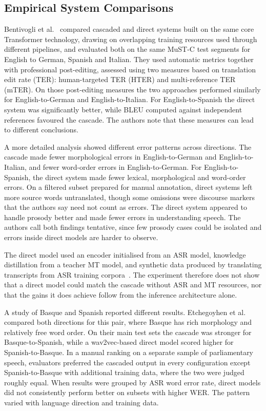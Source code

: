 \subsection{Empirical System Comparisons}

Bentivogli et al.~\cite{bentivogli2021cascade} compared cascaded and direct
systems built on the same core Transformer technology, drawing on overlapping
training resources used through different pipelines, and evaluated both on the
same MuST-C test segments for English to German, Spanish and Italian. They used
automatic metrics together with professional post-editing, assessed using two
measures based on translation edit rate (TER): human-targeted TER (HTER) and
multi-reference TER (mTER). On those post-editing measures the two approaches
performed similarly for English-to-German and English-to-Italian. For
English-to-Spanish the direct system was significantly better, while BLEU
computed against independent references favoured the cascade. The authors note
that these measures can lead to different conclusions.

A more detailed analysis showed different error patterns across directions. The
cascade made fewer morphological errors in English-to-German and
English-to-Italian, and fewer word-order errors in English-to-German. For
English-to-Spanish, the direct system made fewer lexical, morphological and
word-order errors. On a filtered subset prepared for manual annotation, direct
systems left more source words untranslated, though some omissions were
discourse markers that the authors say need not count as errors. The direct
system appeared to handle prosody better and made fewer errors in understanding
speech. The authors call both findings tentative, since few prosody cases could
be isolated and errors inside direct models are harder to observe.

The direct model used an encoder initialised from an ASR model, knowledge
distillation from a teacher MT model, and synthetic data produced by translating
transcripts from ASR training corpora~\cite{bentivogli2021cascade}. The
experiment therefore does not show that a direct model could match the cascade
without ASR and MT resources, nor that the gains it does achieve follow from
the inference architecture alone.

A study of Basque and Spanish reported different results. Etchegoyhen et
al.~\cite{etchegoyhen2022casestudy} compared both directions for this pair,
where Basque has rich morphology and relatively free word order. On their
main test sets the cascade was stronger for Basque-to-Spanish, while a
wav2vec-based direct model scored higher for Spanish-to-Basque. In a manual
ranking on a separate sample of parliamentary speech, evaluators preferred
the cascaded output in every configuration except Spanish-to-Basque with
additional training data, where the two were judged roughly equal. When
results were grouped by ASR word error rate, direct models did not
consistently perform better on subsets with higher WER. The pattern varied
with language direction and training data.

